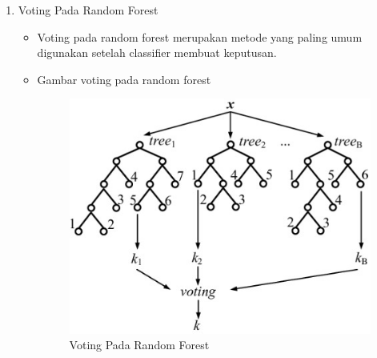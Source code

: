 \begin{enumerate}
\item Voting Pada Random Forest
	\begin{itemize}
		\item Voting pada random forest merupakan metode yang paling umum digunakan setelah classifier membuat keputusan.
		\item Gambar voting pada random forest
			\begin{figure}[ht]
			\centering
			\includegraphics[scale=0.5]{figures/j3.jpg}
			\caption{Voting Pada Random Forest}
			\label{contoh}
			\end{figure}
	\end{itemize}

\end{enumerate}

